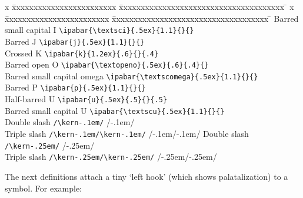 \medskip
\begin{tabbing}
\iftimes
x \=xxxxxxxxxxxxxxxxxxxxxxxx \=xxxxxxxxxxxxxxxxxxxxxxxxxxxxxxxxxxxxxx \= \kill
\else
x \=xxxxxxxxxxxxxxxxxxxxxxxx \=xxxxxxxxxxxxxxxxxxxxxxxxxxxxxxxxxxxx \= \kill
\fi
\> Barred small capital I 
  \SecLine \verb|\ipabar{\textsci}{.5ex}{1.1}{}{}| \>
   \\
\> Barred J 
  \SecLine \verb|\ipabar{j}{.5ex}{1.1}{}{}| \>
   \\
\> Crossed K 
  \SecLine \verb|\ipabar{k}{1.2ex}{.6}{}{.4}| \>
   \\
\> Barred open O 
  \SecLine \verb|\ipabar{\textopeno}{.5ex}{.6}{.4}{}| \>
   \\
\> Barred small capital omega 
  \SecLine \verb|\ipabar{\textscomega}{.5ex}{1.1}{}{}| \>
   \\
\> Barred P 
  \SecLine \verb|\ipabar{p}{.5ex}{1.1}{}{}| \>
   \\
\> Half-barred U 
  \SecLine \verb|\ipabar{u}{.5ex}{.5}{}{.5}| \>
   \\
\> Barred small capital U 
  \SecLine \verb|\ipabar{\textscu}{.5ex}{1.1}{}{}| \>
   \\
\iftimes
\> Double slash 
  \SecLine \verb|/\kern-.1em/| \>
  /\kern-.1em/ \\
\> Triple slash 
  \SecLine \verb|/\kern-.1em/\kern-.1em/| \>
  /\kern-.1em/\kern-.1em/ 
\else
\> Double slash 
  \SecLine \verb|/\kern-.25em/| \>
  /\kern-.25em/ \\
\> Triple slash 
  \SecLine \verb|/\kern-.25em/\kern-.25em/| \>
  /\kern-.25em/\kern-.25em/ 
\fi
\end{tabbing}

The next definitions attach a tiny `left hook' (which shows
palatalization) to a symbol. For example:

